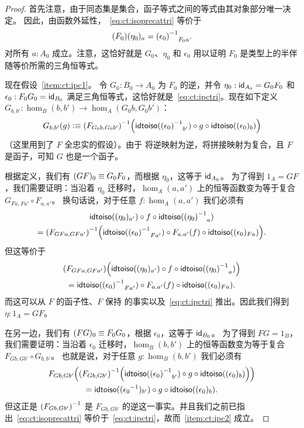 \begin{proof}
  首先注意，由于同态集是集合，函子等式之间的等式由其对象部分唯一决定。
  因此，由函数外延性，~\eqref{eq:ct:isoprecattri} 等价于
  \begin{equation}
    \map{(F_0)}{\eta_0}_a = \opp{(\epsilon_0)}_{F_0 a}.\label{eq:ct:ipctri}
  \end{equation}
  对所有 $a:A_0$ 成立。注意，这恰好就是 $G_0$、$\eta_0$ 和 $\epsilon_0$ 用以证明 $F_0$ 是类型上的半伴随等价所需的三角恒等式。

  现在假设~\ref{item:ct:ipc1}。
  令 $G_0:B_0 \to A_0$ 为 $F_0$ 的逆，并令 $\eta_0: \idfunc[A_0] = G_0 F_0$ 和 $\epsilon_0:F_0G_0 = \idfunc[B_0]$ 满足三角恒等式，这恰好就是~\eqref{eq:ct:ipctri}。现在如下定义 $G_{b,b'}:\hom_B(b,b') \to \hom_A(G_0b,G_0b')$：
  \[ G_{b,b'}(g) \defeq
  \inv{(F_{G_0b,G_0b'})}\Big(\idtoiso(\opp{(\epsilon_0)}_{b'}) \circ g \circ \idtoiso((\epsilon_0)_b)\Big)
  \]
  （这里用到了 $F$ 全忠实的假设）。由于 \idtoiso 将逆映射为逆，将拼接映射为复合，且 $F$ 是函子，可知 $G$ 也是一个函子。

  根据定义，我们有 $(GF)_0 \jdeq G_0 F_0$，而根据 $\eta_0$，这等于 $\idfunc[A_0]$。
  为了得到 $1_A = GF$，我们需要证明：当沿着 $\eta_0$ 迁移时，$\hom_A(a,a')$ 上的恒等函数变为等于复合 $G_{Fa,Fa'} \circ F_{a,a'}$。
  换句话说，对于任意 $f:\hom_A(a,a')$ 我们必须有
  \begin{multline*}
    \idtoiso((\eta_0)_{a'}) \circ f \circ \idtoiso(\opp{(\eta_0)}_a)\\
    = \inv{(F_{GFa,GFa'})}\Big(\idtoiso(\opp{(\epsilon_0)}_{Fa'})
    \circ F_{a,a'}(f) \circ \idtoiso((\epsilon_0)_{Fa})\Big).
  \end{multline*}
  但这等价于
  \begin{multline*}
    (F_{GFa,GFa'})\Big(\idtoiso((\eta_0)_{a'}) \circ f \circ \idtoiso(\opp{(\eta_0)}_a)\Big)\\
    = \idtoiso(\opp{(\epsilon_0)}_{Fa'})
    \circ F_{a,a'}(f) \circ \idtoiso((\epsilon_0)_{Fa}).
  \end{multline*}
  而这可以从 $F$ 的函子性、$F$ 保持 \idtoiso 的事实以及~\eqref{eq:ct:ipctri} 推出。因此我们得到 $\eta:1_A = GF$。

  在另一边，我们有 $(FG)_0\jdeq F_0 G_0$，根据 $\epsilon_0$，这等于 $\idfunc[B_0]$。
  为了得到 $FG=1_B$，我们需要证明：当沿着 $\epsilon_0$ 迁移时，$\hom_B(b,b')$ 上的恒等函数变为等于复合 $F_{Gb,Gb'} \circ G_{b,b'}$。
  也就是说，对于任意 $g:\hom_B(b,b')$ 我们必须有
  \begin{multline*}
    F_{Gb,Gb'}\Big(\inv{(F_{Gb,Gb'})}\Big(\idtoiso(\opp{(\epsilon_0)}_{b'}) \circ g \circ \idtoiso((\epsilon_0)_b)\Big)\Big)\\
    = \idtoiso((\opp{\epsilon_0})_{b'}) \circ g \circ \idtoiso((\epsilon_0)_b).
  \end{multline*}
  但这正是 $\inv{(F_{Gb,Gb'})}$ 是 $F_{Gb,Gb'}$ 的逆这一事实。并且我们之前已指出~\eqref{eq:ct:isoprecattri} 等价于~\eqref{eq:ct:ipctri}，故而~\ref{item:ct:ipc2} 成立。


\end{proof}
